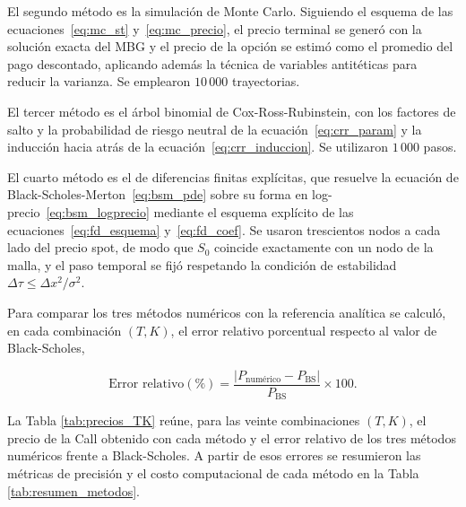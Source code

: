 \documentclass{article}
\begin{document}
El segundo método es la simulación de Monte Carlo. Siguiendo el esquema de las ecuaciones~\eqref{eq:mc_st} y~\eqref{eq:mc_precio}, el precio terminal se generó con la solución exacta del MBG y el precio de la opción se estimó como el promedio del pago descontado, aplicando además la técnica de variables antitéticas para reducir la varianza. Se emplearon $10\,000$ trayectorias.

El tercer método es el árbol binomial de Cox-Ross-Rubinstein, con los factores de salto y la probabilidad de riesgo neutral de la ecuación~\eqref{eq:crr_param} y la inducción hacia atrás de la ecuación~\eqref{eq:crr_induccion}. Se utilizaron $1\,000$ pasos.

El cuarto método es el de diferencias finitas explícitas, que resuelve la ecuación de Black-Scholes-Merton~\eqref{eq:bsm_pde} sobre su forma en log-precio~\eqref{eq:bsm_logprecio} mediante el esquema explícito de las ecuaciones~\eqref{eq:fd_esquema} y~\eqref{eq:fd_coef}. Se usaron trescientos nodos a cada lado del precio spot, de modo que $S_0$ coincide exactamente con un nodo de la malla, y el paso temporal se fijó respetando la condición de estabilidad $\Delta\tau\le \Delta x^2/\sigma^2$.

Para comparar los tres métodos numéricos con la referencia analítica se calculó, en cada combinación $(T,K)$, el error relativo porcentual respecto al valor de Black-Scholes,

\begin{equation}
\text{Error relativo}(\%)=
\frac{\left|P_{\text{numérico}}-P_{\text{BS}}\right|}
{P_{\text{BS}}}\times 100.
\label{eq:error_relativo}
\end{equation}

La Tabla \ref{tab:precios_TK} reúne, para las veinte combinaciones $(T,K)$, el precio de la Call obtenido con cada método y el error relativo de los tres métodos numéricos frente a Black-Scholes. A partir de esos errores se resumieron las métricas de precisión y el costo computacional de cada método en la Tabla \ref{tab:resumen_metodos}.
\end{document}
